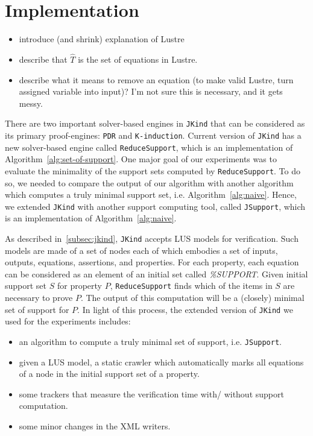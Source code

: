 \section{Implementation}
\label{sec:impl}

\begin{itemize}
    \item introduce (and shrink) explanation of Lustre
    \item describe that $\widehat T$ is the set of equations in Lustre.
    \item describe what it means to remove an equation (to make valid Lustre, 
        turn assigned variable into input)?  I'm not sure this is necessary, and it 
        gets messy.
\end{itemize}

There are two important solver-based engines in \texttt{JKind} that can be considered as its primary proof-engines: \texttt{PDR} and \texttt{K-induction}. Current version of \texttt{JKind} has a new solver-based engine called \texttt{ReduceSupport},
which is an implementation of Algorithm~\ref{alg:set-of-support}.
One major goal of our experiments was to evaluate the minimality of the support sets computed by \texttt{ReduceSupport}.
To do so, we needed to compare the output of our algorithm with another algorithm
which computes a truly minimal support set, i.e. Algorithm~\ref{alg:naive}. Hence, we extended \texttt{JKind}
with another support computing tool, called \texttt{JSupport}, which is an implementation of Algorithm~\ref{alg:naive}.

As described in~\ref{subsec:jkind}, \texttt{JKind} accepts LUS models for verification.
Such models are made of a set of nodes each of which embodies a set of inputs, outputs, equations, assertions, and properties. For each property, each equation can be considered as an element of an initial set called \textit{\%SUPPORT}. Given initial support set $S$ for property $P$, \texttt{ReduceSupport} finds which of the items in $S$ are necessary to prove $P$. The output of this computation will be a (closely) minimal set of support for $P$. In light of this process, the extended version of \texttt{JKind} we used for the experiments includes:

\begin{itemize}
    \item an algorithm to compute a truly minimal set of support, i.e. \texttt{JSupport}.
    \item given a LUS model, a static crawler which automatically marks all equations of a node in the initial support set of a property.
    \item some trackers that measure the verification time with/ without support computation.
    \item some minor changes in the XML writers.
\end{itemize}


